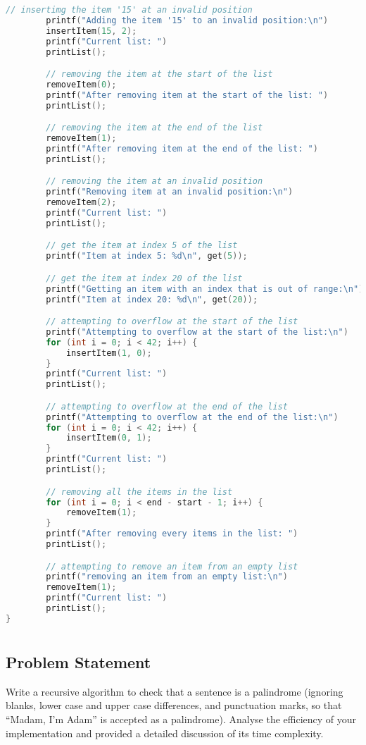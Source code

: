 \documentclass{report}
\begin{document}
\begin{lstlisting}[language=C]
		// insertimg the item '15' at an invalid position
		printf("Adding the item '15' to an invalid position:\n")
		insertItem(15, 2);
		printf("Current list: ")
		printList();

		// removing the item at the start of the list
		removeItem(0);
		printf("After removing item at the start of the list: ")
		printList();

		// removing the item at the end of the list
		removeItem(1);
		printf("After removing item at the end of the list: ")
		printList();

		// removing the item at an invalid position
		printf("Removing item at an invalid position:\n")
		removeItem(2);
		printf("Current list: ")
		printList();

		// get the item at index 5 of the list
		printf("Item at index 5: %d\n", get(5));

		// get the item at index 20 of the list
		printf("Getting an item with an index that is out of range:\n");
		printf("Item at index 20: %d\n", get(20));

		// attempting to overflow at the start of the list
		printf("Attempting to overflow at the start of the list:\n")
		for (int i = 0; i < 42; i++) {
			insertItem(1, 0);
		}
		printf("Current list: ")
		printList();

		// attempting to overflow at the end of the list
		printf("Attempting to overflow at the end of the list:\n")
		for (int i = 0; i < 42; i++) {
			insertItem(0, 1);
		}
		printf("Current list: ")
		printList();

		// removing all the items in the list
		for (int i = 0; i < end - start - 1; i++) {
			removeItem(1);
		}
		printf("After removing every items in the list: ")
		printList();

		// attempting to remove an item from an empty list
		printf("removing an item from an empty list:\n")
		removeItem(1);
		printf("Current list: ")
		printList();
}
\end{lstlisting}
\chapter{}
\section{Problem Statement}
Write a recursive algorithm to check that a sentence is a palindrome (ignoring blanks, lower case and upper case differences, and punctuation marks, so that ``Madam, I'm Adam'' is accepted as a palindrome). Analyse the efficiency of your implementation and provided a detailed discussion of its time complexity.
\end{document}

